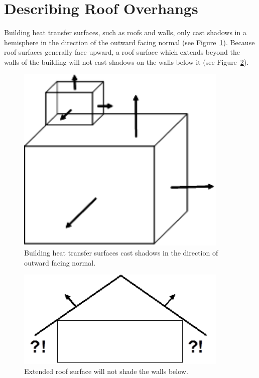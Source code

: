 \section{Describing Roof Overhangs}\label{describing-roof-overhangs}

Building heat transfer surfaces, such as roofs and walls, only cast shadows in a hemisphere in the direction of the outward facing normal (see Figure~\ref{fig:building-heat-transfer-surfaces-cast-shadows}). Because roof surfaces generally face upward, a roof surface which extends beyond the walls of the building will not cast shadows on the walls below it (see Figure~\ref{fig:extended-roof-surface-will-not-shade}).

\begin{figure}[hbtp] %
\centering
\includegraphics[width=0.9\textwidth, height=0.9\textheight, keepaspectratio=true]{media/image003.png}
\caption{Building heat transfer surfaces cast shadows in the direction of outward facing normal. \protect \label{fig:building-heat-transfer-surfaces-cast-shadows}}
\end{figure}

\begin{figure}[hbtp] %
\centering
\includegraphics[width=0.9\textwidth, height=0.9\textheight, keepaspectratio=true]{media/image004.png}
\caption{Extended roof surface will not shade the walls below. \protect \label{fig:extended-roof-surface-will-not-shade}}
\end{figure}


